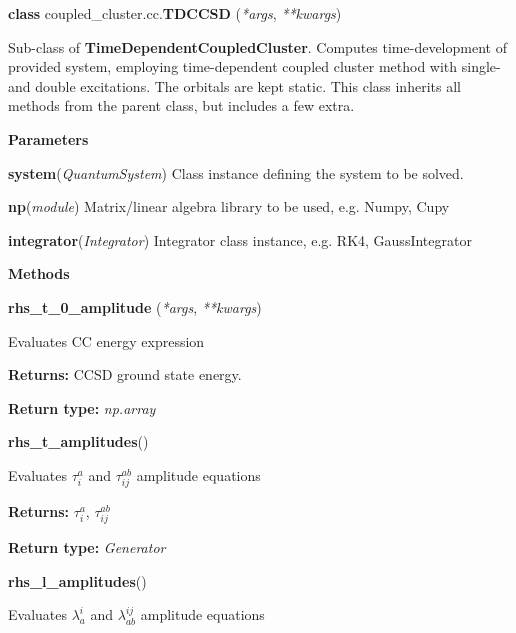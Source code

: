 \begin{tcolorbox}
    {\selectfont
    \textbf{class} coupled\_cluster.cc.\textbf{TDCCSD}
    (\emph{*args}, \emph{**kwargs})

    \vspace{1em}
    Sub-class of \textbf{TimeDependentCoupledCluster}.
    Computes time-development of provided system, employing time-dependent 
    coupled cluster method with single- and double excitations. The orbitals are kept 
    static. This class inherits all methods from the parent class, but includes 
    a few extra.

    \vspace{1em}
    \textbf{Parameters}

    \hspace{2em}\textbf{system}(\emph{QuantumSystem}) 
        Class instance defining the system to be solved.

    \hspace{2em}\textbf{np}(\emph{module})
        Matrix/linear algebra library to be used, e.g. Numpy, Cupy
    
    \hspace{2em}\textbf{integrator}(\emph{Integrator})
        Integrator class instance, e.g. RK4, GaussIntegrator

    \vspace{1em}
    \textbf{Methods}

    \hspace{2em} \textbf{rhs\_t\_0\_amplitude} (\emph{*args}, \emph{**kwargs})
        \begin{adjustwidth}{4em}{}
        Evaluates CC energy expression

        \textbf{Returns:} CCSD ground state energy.

        \textbf{Return type:} \emph{np.array}
        \end{adjustwidth} 

    \hspace{2em} \textbf{rhs\_t\_amplitudes}()
        \begin{adjustwidth}{4em}{}
        Evaluates $\tau^a_i$ and $\tau^{ab}_{ij}$ amplitude equations

        \textbf{Returns:} $\tau^a_i$, $\tau^{ab}_{ij}$

        \textbf{Return type:} \emph{Generator}
        \end{adjustwidth}

    \hspace{2em} \textbf{rhs\_l\_amplitudes}()
        \begin{adjustwidth}{4em}{}
        Evaluates $\lambda^i_a$ and $\lambda^{ij}_{ab}$ amplitude equations


\end{adjustwidth}}
\end{tcolorbox}
